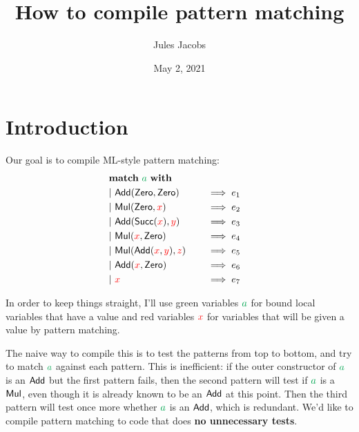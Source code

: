 \documentclass[a4paper, 11pt]{article}
\title{How to compile pattern matching}
\author{Jules Jacobs}
\date{May 2, 2021}
\theoremstyle{definition}
\begin{document}
\maketitle



\newcommand{\matchwith}[1]{&\mathbf{match}\ #1\ \mathbf{with}}
\newcommand{\matchwithZ}[1]{&\mathbf{match\#}\ #1\ \mathbf{with}}
\newcommand{\matchclauses}{&\mathbf{match}}
\newcommand{\clause}[2]{&\mathbf{\mid}\ #1\quad &&\implies #2 &}
\newcommand{\multimatch}{&\mathbf{multimatch}}
\newcommand{\constr}[1]{\mathsf{\textcolor{black}{#1}}}
\newcommand{\Add}{\constr{Add}}
\newcommand{\Mul}{\constr{Mul}}
\newcommand{\Zero}{\constr{Zero}}
\newcommand{\Succ}{\constr{Succ}}
\newcommand{\Var}{\constr{Var}}
\newcommand{\pat}{\mathcal{P}}
\newcommand{\C}{\constr{C}}
\newcommand{\fvar}[1]{\textcolor{red}{#1}}
\newcommand{\bvar}[1]{\textcolor{Green}{#1}}
\newcommand{\ba}{\bvar{a}}
\newcommand{\lett}[2]{\mathbf{let}\ #1 = #2\ \mathbf{in}\ }


\section{Introduction}

Our goal is to compile ML-style pattern matching:
\begin{alignat*}{4}
  \matchwith{\ba} \\
  \clause{\Add(\Zero, \Zero)}{e_1} \\
  \clause{\Mul(\Zero, \fvar{x})}{e_2} \\
  \clause{\Add(\Succ(\fvar x), \fvar y)}{e_3} \\
  \clause{\Mul(\fvar x, \Zero)}{e_4} \\
  \clause{\Mul(\Add(\fvar x, \fvar y), \fvar z)}{e_5} \\
  \clause{\Add(\fvar x, \Zero)}{e_6} \\
  \clause{\fvar x}{e_7} \\
\end{alignat*}

In order to keep things straight, I'll use green variables $\ba$ for bound local variables that have a value and red variables $\fvar{x}$ for variables that will be given a value by pattern matching.

The naive way to compile this is to test the patterns from top to bottom, and try to match $\ba$ against each pattern. This is inefficient: if the outer constructor of $\ba$ is an $\Add$ but the first pattern fails, then the second pattern will test if $\ba$ is a $\Mul$, even though it is already known to be an $\Add$ at this point. Then the third pattern will test once more whether $\ba$ is an $\Add$, which is redundant. We'd like to compile pattern matching to code that does \textbf{no unnecessary tests}.
\end{document}
